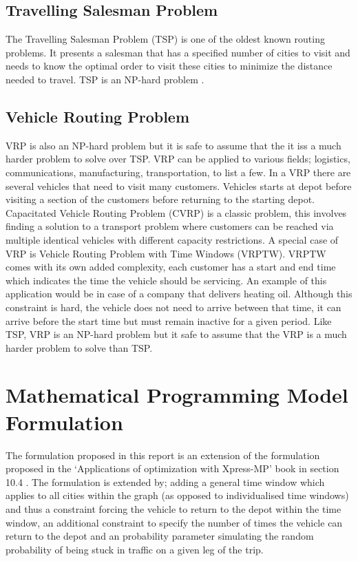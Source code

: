 \documentclass[a4paper,11pt]{article}
\begin{document}
\subsection{Travelling Salesman Problem}
The Travelling Salesman Problem (TSP) is one of the oldest known routing problems. It presents a salesman that has a specified number of cities to visit and needs to know the optimal order to visit these cities to minimize the distance needed to travel. TSP is an NP-hard problem \cite{lenstra1981complexity}.

\subsection{Vehicle Routing Problem}
VRP is also an NP-hard problem but it is safe to assume that the it iss a much harder problem to solve over TSP. VRP can be applied to various fields; logistics, communications, manufacturing, transportation, to list a few. In a VRP there are several vehicles that need to visit many customers. Vehicles starts at depot before visiting a section of the customers before returning to the starting depot. 
Capacitated Vehicle Routing Problem (CVRP) is a classic problem, this involves finding a solution to a transport problem where customers can be reached via multiple identical vehicles with different capacity restrictions. 
A special case of VRP is Vehicle Routing Problem with Time Windows (VRPTW). VRPTW comes with its own added complexity, each customer has a start and end time which indicates the time the vehicle should be servicing. An example of this application would be in case of a company that delivers heating oil. Although this constraint is hard, the vehicle does not need to arrive between that time, it can arrive before the start time but must remain inactive for a given period. 
Like TSP, VRP is an NP-hard problem \cite{lenstra1981complexity} but it safe to assume that the VRP is a much harder problem to solve than TSP. 



\section{Mathematical Programming Model Formulation}

The formulation proposed in this report is an extension of the formulation proposed in the `Applications of optimization with Xpress-MP' book in section 10.4 \cite{gueret1999applications}. The formulation is extended by; adding a general time window which applies to all cities within the graph (as opposed to individualised time windows) and thus a constraint forcing the vehicle to return to the depot within the time window, an additional constraint to specify the number of times the vehicle can return to the depot and an probability parameter simulating the random probability of being stuck in traffic on a given leg of the trip.
\end{document}

